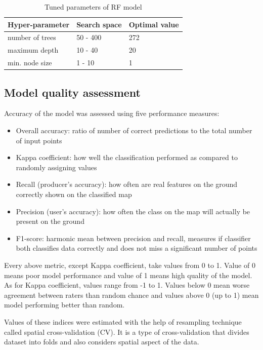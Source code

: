 \documentclass{amuthesis}
\begin{document}
\hypertarget{tbl-tabela3}{}
\begin{table}
\caption{\label{tbl-tabela3}Tuned parameters of RF model }\tabularnewline

\centering
\begin{tabular}{|>{}l|>{}l|>{}l|}
\toprule
\textbf{Hyper-parameter} & \textbf{Search space} & \textbf{Optimal value}\\
\midrule
number of trees & 50 - 400 & 272\\
\hline
maximum depth & 10 - 40 & 20\\
\hline
min. node size & 1 - 10 & 1\\
\bottomrule
\end{tabular}
\end{table}

\hypertarget{sec-resampling}{%
\subsection{Model quality assessment}\label{sec-resampling}}

Accuracy of the model was assessed using five performance measures:

\begin{itemize}
\item
  Overall accuracy: ratio of number of correct predictions to the total
  number of input points
\item
  Kappa coefficient: how well the classification performed as compared
  to randomly assigning values
\item
  Recall (producer's accuracy): how often are real features on the
  ground correctly shown on the classified map
\item
  Precision (user's accuracy): how often the class on the map will
  actually be present on the ground
\item
  F1-score: harmonic mean between precision and recall, measures if
  classifier both classifies data correctly and does not miss a
  significant number of points
\end{itemize}

Every above metric, except Kappa coefficient, take values from 0 to 1.
Value of 0 means poor model performance and value of 1 means high
quality of the model. As for Kappa coefficient, values range from -1 to
1. Values below 0 mean worse agreement between raters than random chance
and values above 0 (up to 1) mean model performing better than random.

Values of these indices were estimated with the help of resampling
technique called spatial cross-validation (CV). It is a type of
cross-validation that divides dataset into folds and also considers
spatial aspect of the data.
\end{document}

